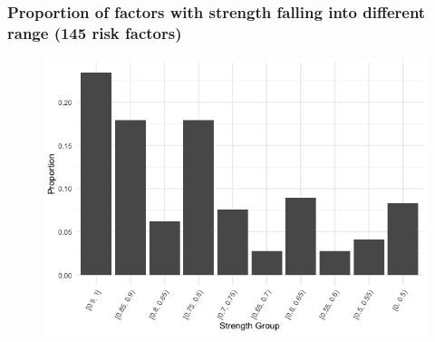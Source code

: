 \documentclass[12pt]{beamer}
\begin{document}
\begin{frame}[plain]
\frametitle{Proportion of factors with strength falling into different range (145 risk factors)}
\begin{figure}
        \includegraphics[scale = 0.45]{figure/30_strength.png}
\end{figure}
\end{frame}
\end{document}
